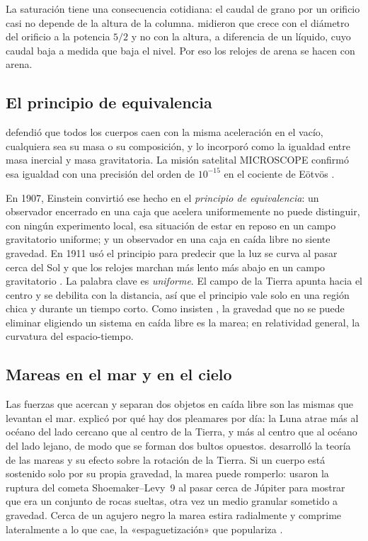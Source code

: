 \documentclass[11pt,a4paper]{article}
\begin{document}
La saturación tiene una consecuencia cotidiana: el caudal de grano por un orificio casi no depende de la altura de la columna. \textcite{beverloo1961} midieron que crece con el diámetro del orificio a la potencia $5/2$ y no con la altura, a diferencia de un líquido, cuyo caudal baja a medida que baja el nivel. Por eso los relojes de arena se hacen con arena.

\subsection{El principio de equivalencia}

\textcite{galilei1638} defendió que todos los cuerpos caen con la misma aceleración en el vacío, cualquiera sea su masa o su composición, y \textcite{newton1687} lo incorporó como la igualdad entre masa inercial y masa gravitatoria. La misión satelital MICROSCOPE confirmó esa igualdad con una precisión del orden de $10^{-15}$ en el cociente de Eötvös \parencite{touboul2022}.

En 1907, Einstein convirtió ese hecho en el \emph{principio de equivalencia}: un observador encerrado en una caja que acelera uniformemente no puede distinguir, con ningún experimento local, esa situación de estar en reposo en un campo gravitatorio uniforme; y un observador en una caja en caída libre no siente gravedad. En 1911 usó el principio para predecir que la luz se curva al pasar cerca del Sol y que los relojes marchan más lento más abajo en un campo gravitatorio \parencite{einstein1911}. La palabra clave es \emph{uniforme}. El campo de la Tierra apunta hacia el centro y se debilita con la distancia, así que el principio vale solo en una región chica y durante un tiempo corto. Como insisten \textcite{misner1973}, la gravedad que no se puede eliminar eligiendo un sistema en caída libre es la marea; en relatividad general, la curvatura del espacio-tiempo.

\subsection{Mareas en el mar y en el cielo}

Las fuerzas que acercan y separan dos objetos en caída libre son las mismas que levantan el mar. \textcite{newton1687} explicó por qué hay dos pleamares por día: la Luna atrae más al océano del lado cercano que al centro de la Tierra, y más al centro que al océano del lado lejano, de modo que se forman dos bultos opuestos. \textcite{darwin1898} desarrolló la teoría de las mareas y su efecto sobre la rotación de la Tierra. Si un cuerpo está sostenido solo por su propia gravedad, la marea puede romperlo: \textcite{asphaug1994} usaron la ruptura del cometa Shoemaker--Levy~9 al pasar cerca de Júpiter para mostrar que era un conjunto de rocas sueltas, otra vez un medio granular sometido a gravedad. Cerca de un agujero negro la marea estira radialmente y comprime lateralmente a lo que cae, la «espaguetización» que populariza \textcite{thorne1994}.
\end{document}
